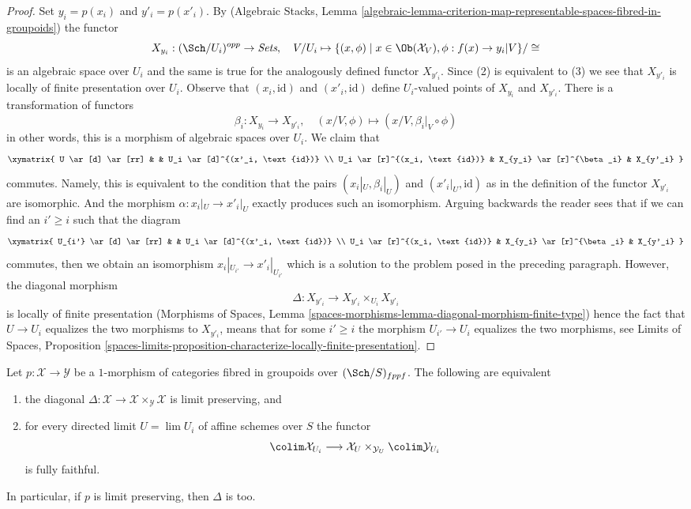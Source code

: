 \begin{proof}
\medskip\noindent
Set $y_i = p(x_i)$ and $y'_i = p(x'_i)$.
By (Algebraic Stacks, Lemma
\ref{algebraic-lemma-criterion-map-representable-spaces-fibred-in-groupoids})
the functor
$$
X_{y_i} : (\Sch/U_i)^{opp} \to \textit{Sets},\quad
V/U_i \mapsto
\{(x, \phi) \mid x \in \Ob(\mathcal{X}_V), \phi : f(x) \to y_i|V\}/\cong
$$
is an algebraic space over $U_i$ and the same is true for the
analogously defined functor $X_{y'_i}$. Since (2) is equivalent to (3)
we see that $X_{y'_i}$ is locally of finite presentation over $U_i$.
Observe that $(x_i, \text{id})$ and $(x'_i, \text{id})$ define
$U_i$-valued points of $X_{y_i}$ and $X_{y'_i}$.
There is a transformation of functors
$$
\beta_i : X_{y_i} \to X_{y'_i},\quad
(x/V, \phi) \mapsto (x/V, \beta_i|_V \circ \phi)
$$
in other words, this is a morphism of algebraic spaces over $U_i$.
We claim that
$$
\xymatrix{
U \ar[d] \ar[rr] & & U_i \ar[d]^{(x'_i, \text{id})} \\
U_i \ar[r]^{(x_i, \text{id})} & X_{y_i} \ar[r]^{\beta_i} & X_{y'_i}
}
$$
commutes. Namely, this is equivalent to the condition that
the pairs $(x_i|_U, \beta_i|_U)$ and $(x'_i|_U, \text{id})$
as in the definition of the functor $X_{y'_i}$ are isomorphic.
And the morphism $\alpha : x_i|_U \to x'_i|_U$ exactly produces
such an isomorphism. Arguing backwards the reader sees that
if we can find an $i' \geq i$ such that the diagram
$$
\xymatrix{
U_{i'} \ar[d] \ar[rr] & & U_i \ar[d]^{(x'_i, \text{id})} \\
U_i \ar[r]^{(x_i, \text{id})} & X_{y_i} \ar[r]^{\beta_i} & X_{y'_i}
}
$$
commutes, then we obtain an isomorphism $x_i|_{U_{i'}} \to x'_i|_{U_{i'}}$
which is a solution to the problem posed in the preceding paragraph.
However, the diagonal morphism
$$
\Delta : X_{y'_i} \to X_{y'_i} \times_{U_i} X_{y'_i}
$$
is locally of finite presentation (Morphisms of Spaces, Lemma
\ref{spaces-morphisms-lemma-diagonal-morphism-finite-type})
hence the fact that $U \to U_i$ equalizes the two morphisms to $X_{y'_i}$,
means that for some $i' \geq i$ the morphism $U_{i'} \to U_i$
equalizes the two morphisms, see
Limits of Spaces, Proposition
\ref{spaces-limits-proposition-characterize-locally-finite-presentation}.
\end{proof}

\begin{lemma}
\label{lemma-limit-preserving-diagonal}
Let $p : \mathcal{X} \to \mathcal{Y}$ be a $1$-morphism of categories
fibred in groupoids over $(\Sch/S)_{fppf}$. The following are equivalent
\begin{enumerate}
\item the diagonal
$\Delta : \mathcal{X} \to \mathcal{X} \times_\mathcal{Y} \mathcal{X}$
is limit preserving, and
\item for every directed limit $U = \lim U_i$ of affine schemes over $S$
the functor
$$
\colim \mathcal{X}_{U_i} \longrightarrow
\mathcal{X}_U \times_{\mathcal{Y}_U} \colim \mathcal{Y}_{U_i}
$$
is fully faithful.
\end{enumerate}
In particular, if $p$ is limit preserving, then $\Delta$ is too.
\end{lemma}

